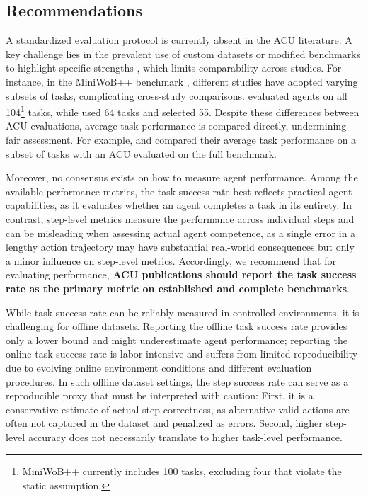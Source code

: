 \subsection{Recommendations}
A standardized evaluation protocol is currently absent in the ACU literature. A key challenge lies in the prevalent use of custom datasets or modified benchmarks to highlight specific strengths , which limits comparability across studies.
For instance, in the MiniWoB++ benchmark \citep{shi_world_2017,liu_reinforcement_2018}, different studies have adopted varying subsets of tasks, complicating cross-study comparisons. \citet{humphreys_data-driven_2022} evaluated agents on all 104\footnote{MiniWoB++ currently includes 100 tasks, excluding four that violate the static assumption.} tasks, while \citet{zheng_synapse_2024} used 64 tasks and \citet{kim_language_2023} selected 55. 
Despite these differences between ACU evaluations, average task performance is compared directly, undermining fair assessment. 
For example, \citet[Figure 3]{zheng_synapse_2024} and \citet[Figure 4 (b)]{kim_language_2023} compared their average task performance on a subset of tasks with an ACU evaluated on the full benchmark.

Moreover, no consensus exists on how to measure agent performance.
Among the available performance metrics, the task success rate best reflects practical agent capabilities, as it evaluates whether an agent completes a task in its entirety.
In contrast, step-level metrics measure the performance across individual steps and can be misleading when assessing actual agent competence, as a single error in a lengthy action trajectory may have substantial real-world consequences but only a minor influence on step-level metrics.
Accordingly, we recommend that for evaluating performance, \textbf{ACU publications should report the task success rate as the primary metric on established and complete benchmarks}.

While task success rate can be reliably measured in controlled environments, it is challenging for offline datasets. 
Reporting the offline task success rate provides only a lower bound and might underestimate agent performance; reporting the online task success rate is labor-intensive and suffers from limited reproducibility due to evolving online environment conditions and different evaluation procedures.
In such offline dataset settings, the step success rate can serve as a reproducible proxy that must be interpreted with caution:
First, it is a conservative estimate of actual step correctness, as alternative valid actions are often not captured in the dataset and penalized as errors.
Second, higher step-level accuracy does not necessarily translate to higher task-level performance.

